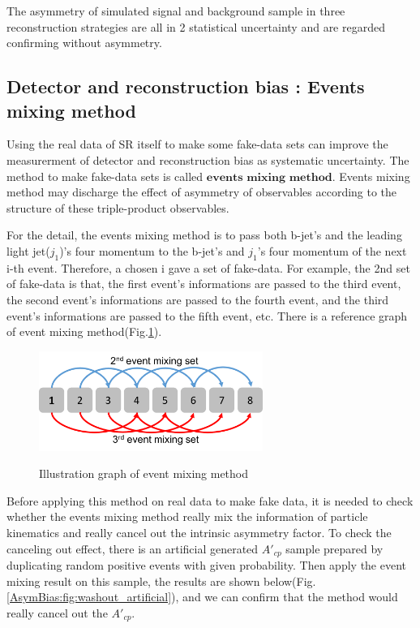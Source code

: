 		The asymmetry of simulated signal and background sample in three reconstruction strategies are all in 2 statistical uncertainty and are regarded confirming without asymmetry.

	\subsection{Detector and reconstruction bias : Events mixing method}
	\label{ssec:evts_mixing}

		Using the real data of SR itself to make some fake-data sets can improve the measurerment of detector and reconstruction bias as systematic uncertainty. The method to make fake-data sets is called $\textbf{events mixing method}$. Events mixing method may discharge the effect of asymmetry of observables according to the structure of these triple-product observables.

		For the detail, the events mixing method is to pass both b-jet's and the leading light jet($j_1$)'s four momentum to the b-jet's and $j_1$'s four momentum of the next i-th event. Therefore, a chosen i gave a set of fake-data. For example, the 2nd set of fake-data is that, the first event's informations are passed to the third event, the second event's informations are passed to the fourth event, and the third event's informations are passed to the fifth event, etc. There is a reference graph of event mixing method(Fig.\ref{AsymBias:fig:event_mixing}).

		\begin{figure}[H]
		\centering{}
	    	\includegraphics[width=0.65\textwidth]{Figures/Asym/event_mixing.pdf}\\
		\caption{Illustration graph of event mixing method}
		\label{AsymBias:fig:event_mixing}
		\end{figure}
		\FloatBarrier

		Before applying this method on real data to make fake data, it is needed to check whether the events mixing method really mix the information of particle kinematics and really cancel out the intrinsic asymmetry factor. To check the canceling out effect, there is an artificial generated $A'_{cp}$ sample prepared by duplicating random positive events with given probability. Then apply the event mixing result on this sample, the results are shown below(Fig.\ref{AsymBias:fig:washout_artificial}), and we can confirm that the method would really cancel out the $A'_{cp}$.

